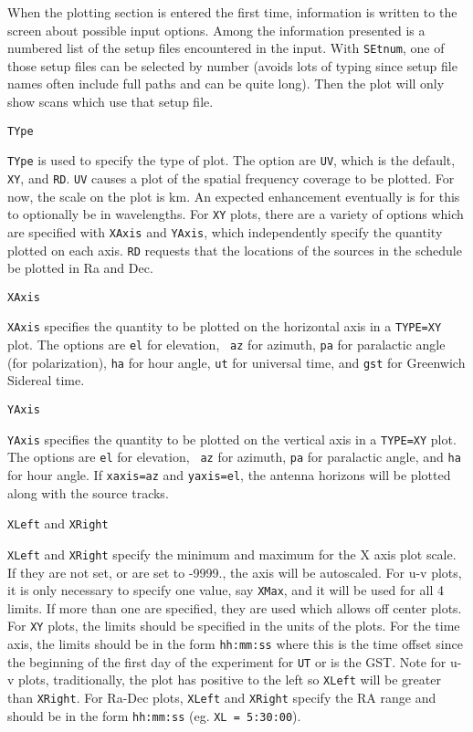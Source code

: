 \documentclass{report}
\begin{document}
When the plotting section is entered the first time, information is written
to the screen about possible input options.  Among the information presented
is a numbered list of the setup files encountered in the input.  With
{\tt SEtnum}, one of those setup files can be selected by number (avoids
lots of typing since setup file names often include full paths and can
be quite long).  Then the plot will only show scans which use that setup
file.

{\tt TYpe}

{\tt TYpe} is used to specify the type of plot.  The option are {\tt UV},
which is the default, {\tt XY}, and {\tt RD}.  {\tt UV} causes a plot of the
spatial frequency coverage to be plotted.  For now, the scale on the
plot is km.  An expected enhancement eventually is for this to optionally
be in wavelengths.  For {\tt XY} plots, there are a variety of options
which are specified with {\tt XAxis} and {\tt YAxis}, which independently
specify the quantity plotted on each axis.  {\tt RD} requests that the
locations of the sources in the schedule be plotted in Ra and Dec.

{\tt XAxis}

{\tt XAxis} specifies the quantity to be plotted on the horizontal axis
in a {\tt TYPE=XY} plot.  The options are {\tt el} for elevation, {\tt
az} for azimuth, {\tt pa} for paralactic angle (for polarization),
{\tt ha} for hour angle, {\tt ut} for universal time, and {\tt gst} for
Greenwich Sidereal time.

{\tt YAxis}

{\tt YAxis} specifies the quantity to be plotted on the vertical axis
in a {\tt TYPE=XY} plot. The options are {\tt el} for elevation, {\tt
az} for azimuth, {\tt pa} for paralactic angle, and {\tt ha} for hour
angle.  If {\tt xaxis=az} and {\tt yaxis=el}, the antenna horizons
will be plotted along with the source tracks.

{\tt XLeft} and {\tt XRight}

{\tt XLeft} and {\tt XRight} specify the minimum and maximum for the
X axis plot scale.  If they are not set, or are set to -9999., the axis will
be autoscaled.  For u-v plots, it is only necessary to specify one
value, say {\tt XMax}, and it will be used for all 4 limits.  If more
than one are specified, they are used which allows off center plots.
For {\tt XY} plots, the limits should be specified in the units of
the plots.  For the time axis, the limits should be in the form
{\tt hh:mm:ss} where this is the time offset since the beginning of the
first day of the experiment for {\tt UT} or is the GST.  Note for u-v
plots, traditionally, the plot has positive to the left so {\tt XLeft} will
be greater than {\tt XRight}.  For Ra-Dec plots, {\tt XLeft} and {\tt XRight}
specify the RA range and should be in the form {\tt hh:mm:ss} (eg.
{\tt XL = 5:30:00}).
\end{document}
